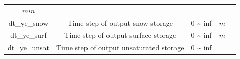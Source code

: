 \documentclass[]{scrbook}
\begin{document}
\begin{longtable}[]{@{}ccccc@{}}
\begin{minipage}[t]{0.10\columnwidth}
\(min\)\strut
\end{minipage} & \begin{minipage}[t]{0.26\columnwidth}\centering\strut
\strut
\end{minipage}\tabularnewline
\begin{minipage}[t]{0.17\columnwidth}\centering\strut
dt\_ye\_snow\strut
\end{minipage} & \begin{minipage}[t]{0.23\columnwidth}\centering\strut
Time step of output snow storage\strut
\end{minipage} & \begin{minipage}[t]{0.10\columnwidth}\centering\strut
0 \textasciitilde{} inf\strut
\end{minipage} & \begin{minipage}[t]{0.10\columnwidth}\centering\strut
\(m\)\strut
\end{minipage} & \begin{minipage}[t]{0.26\columnwidth}\centering\strut
\strut
\end{minipage}\tabularnewline
\begin{minipage}[t]{0.17\columnwidth}\centering\strut
dt\_ye\_surf\strut
\end{minipage} & \begin{minipage}[t]{0.23\columnwidth}\centering\strut
Time step of output surface storage\strut
\end{minipage} & \begin{minipage}[t]{0.10\columnwidth}\centering\strut
0 \textasciitilde{} inf\strut
\end{minipage} & \begin{minipage}[t]{0.10\columnwidth}\centering\strut
\(m\)\strut
\end{minipage} & \begin{minipage}[t]{0.26\columnwidth}\centering\strut
\strut
\end{minipage}\tabularnewline
\begin{minipage}[t]{0.17\columnwidth}\centering\strut
dt\_ye\_unsat\strut
\end{minipage} & \begin{minipage}[t]{0.23\columnwidth}\centering\strut
Time step of output unsaturated storage\strut
\end{minipage} & \begin{minipage}[t]{0.10\columnwidth}\centering\strut
0 \textasciitilde{} inf\strut
\end{minipage} & \begin{minipage}[t]{0.10\columnwidth}\centering\strut

\end{minipage}
\end{longtable}
\end{document}
